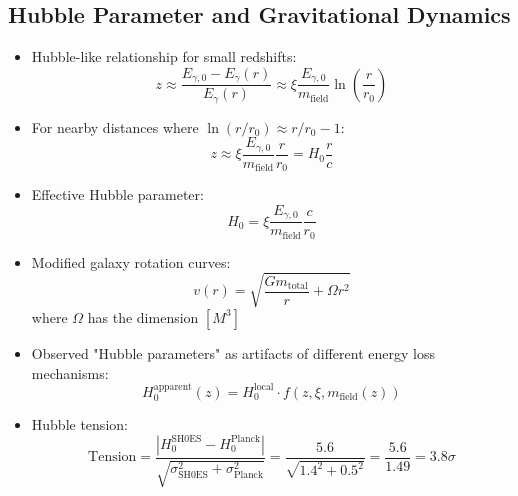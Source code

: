 \documentclass[12pt,a4paper]{article}
\begin{document}
	\subsection{Hubble Parameter and Gravitational Dynamics}
	\begin{itemize}
		\item Hubble-like relationship for small redshifts:
		\begin{equation}
			z \approx \frac{E_{\gamma,0} - E_\gamma(r)}{E_\gamma(r)} \approx \xi \frac{E_{\gamma,0}}{m_{\text{field}}} \ln\left(\frac{r}{r_0}\right)
		\end{equation}
		
		\item For nearby distances where $\ln(r/r_0) \approx r/r_0 - 1$:
		\begin{equation}
			z \approx \xi \frac{E_{\gamma,0}}{m_{\text{field}}} \frac{r}{r_0} = H_0 \frac{r}{c}
		\end{equation}
		
		\item Effective Hubble parameter:
		\begin{equation}
			H_0 = \xi \frac{E_{\gamma,0}}{m_{\text{field}}} \frac{c}{r_0}
		\end{equation}
		
		\item Modified galaxy rotation curves:
		\begin{equation}
			v(r) = \sqrt{\frac{Gm_{\text{total}}}{r} + \Omega r^2}
		\end{equation}
		where $\Omega$ has the dimension $[M^3]$
		
		\item Observed "Hubble parameters" as artifacts of different energy loss mechanisms:
		\begin{equation}
			H_0^{\text{apparent}}(z) = H_0^{\text{local}} \cdot f(z, \xi, m_{\text{field}}(z))
		\end{equation}
		
		\item Hubble tension:
		\begin{equation}
			\text{Tension} = \frac{|H_0^{\text{SH0ES}} - H_0^{\text{Planck}}|}{\sqrt{\sigma_{\text{SH0ES}}^2 + \sigma_{\text{Planck}}^2}} = \frac{5.6}{\sqrt{1.4^2 + 0.5^2}} = \frac{5.6}{1.49} = 3.8\sigma
		\end{equation}
	\end{itemize}
	
\end{document}
